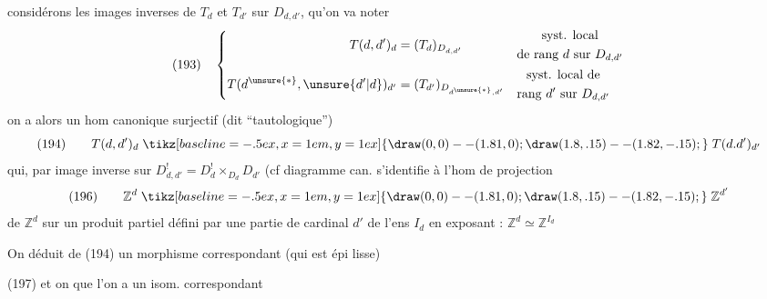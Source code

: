 considérons les images inverses de $T_d$ et $T_{d'}$ sur $D_{d,d'}$, qu'on va noter
\[
(193)\quad\left\{\begin{aligned}
T(d,d')_d&=(T_d)_{D_{d,d'}}&&\begin{gathered}\text{syst. local}\\\text{de rang }d\text{ sur }D_{d,d'}\end{gathered}\\
T(d^{\unsure{*}},\unsure{d'|d})_{d'}&=(T_{d'})_{D_{d^{\unsure{*}},d'}}&&\begin{gathered}\text{syst. local de}\\\text{rang }d'\text{ sur }D_{d,d'}\end{gathered}
\end{aligned}\right.
\]
on a alors un hom canonique surjectif (dit ``tautologique'')
\[
(194)\qquad T(d,d')_d\mathrel{\tikz[baseline=-.5ex,x=1em,y=1ex]{\draw (0,0)--(1.81,0);\draw (1.8,.15)--(1.82,-.15);}}T(d.d')_{d'}
\]
qui, par image inverse sur $D^!_{d,d'}=D^!_d\mathbin\times_{D_d}D_{d'}$ (cf diagramme can.
s'identifie à l'hom de projection
\[
(196)\qquad\mathbb Z^d\mathrel{\tikz[baseline=-.5ex,x=1em,y=1ex]{\draw (0,0)--(1.81,0);\draw (1.8,.15)--(1.82,-.15);}}\mathbb Z^{d'}
\]
de $\mathbb Z^d$ sur un produit partiel défini par une partie de cardinal $d'$ de l'ens $I_d$ en exposant : $\mathbb Z^d\simeq\mathbb Z^{I_d}$

On déduit de (194) un morphisme correspondant (qui est épi lisse)

(197)\quad
{}
et on  que l'on a un isom. correspondant

